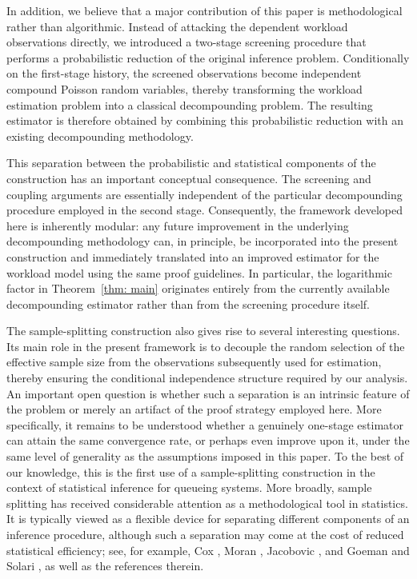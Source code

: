 \documentclass[12pt]{article}
\newcommand{\1}{\mathbf{1}}
\begin{document}
In addition, we believe that a major contribution of this paper is methodological rather than algorithmic. Instead of attacking the dependent workload observations directly, we introduced a two-stage screening procedure that performs a probabilistic reduction of the original inference problem. Conditionally on the first-stage history, the screened observations become independent compound Poisson random variables, thereby transforming the workload estimation problem into a classical decompounding problem. The resulting estimator is therefore obtained by combining this probabilistic reduction with an existing decompounding methodology. 

This separation between the probabilistic and statistical components of the construction has an important conceptual consequence. The screening and coupling arguments are essentially independent of the particular decompounding procedure employed in the second stage. Consequently, the framework developed here is inherently modular: any future improvement in the underlying decompounding methodology can, in principle, be incorporated into the present construction and immediately translated into an improved estimator for the workload model using the same proof guidelines. In particular, the logarithmic factor in Theorem~\ref{thm: main} originates entirely from the currently available decompounding estimator rather than from the screening procedure itself. 

The sample-splitting construction also gives rise to several interesting questions.
Its main role in the present framework is to decouple the random selection of the
effective sample size from the observations subsequently used for estimation,
thereby ensuring the conditional independence structure required by our analysis.
An important open question is whether such a separation is an intrinsic feature of
the problem or merely an artifact of the proof strategy employed here. More
specifically, it remains to be understood whether a genuinely one-stage estimator
can attain the same convergence rate, or perhaps even improve upon it, under the
same level of generality as the assumptions imposed in this paper. To the best of our knowledge, this is the first use of a sample-splitting construction in the context of statistical inference for queueing systems. More broadly, sample splitting has received considerable attention as a methodological tool in statistics. It is typically viewed as a flexible device for separating different components of an inference procedure, although such a separation may come at the cost of reduced statistical efficiency; see, for example, Cox \cite{Cox1975}, Moran \cite{Moran1973}, Jacobovic \cite{Jacobovic2022}, and Goeman and Solari \cite{Goeman2024}, as well as the references therein.
\end{document}

